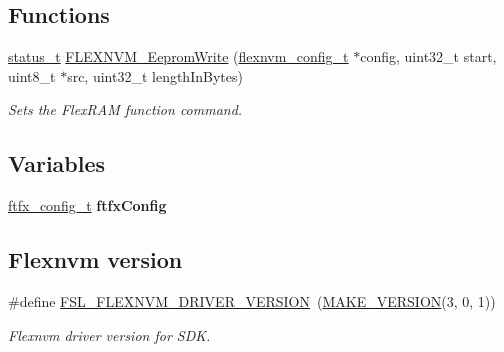 \subsection*{Functions}
\begin{DoxyCompactItemize}
\item 
\mbox{\hyperlink{group__ksdk__common_gaaabdaf7ee58ca7269bd4bf24efcde092}{status\+\_\+t}} \mbox{\hyperlink{group__ftfx__flexnvm__driver_ga38dc1922e79536abd0a3e9745d8da6e1}{F\+L\+E\+X\+N\+V\+M\+\_\+\+Eeprom\+Write}} (\mbox{\hyperlink{group__ftfx__flexnvm__driver_ga8fd4d473c0a4b30cac163160fb28a6c1}{flexnvm\+\_\+config\+\_\+t}} $\ast$config, uint32\+\_\+t start, uint8\+\_\+t $\ast$src, uint32\+\_\+t length\+In\+Bytes)
\begin{DoxyCompactList}\small\item\em Sets the Flex\+R\+AM function command. \end{DoxyCompactList}\end{DoxyCompactItemize}
\subsection*{Variables}
\begin{DoxyCompactItemize}
\item 
\mbox{\label{group__ftfx__flexnvm__driver_ga3e5d62da168e379cd9ffdf76d929bb38}} 
\mbox{\hyperlink{group__ftfx__controller_gab0196063c05bffb4cd2f249699a3378c}{ftfx\+\_\+config\+\_\+t}} {\bfseries ftfx\+Config}
\end{DoxyCompactItemize}
\subsection*{Flexnvm version}
\begin{DoxyCompactItemize}
\item 
\#define \mbox{\hyperlink{group__ftfx__flexnvm__driver_ga3edd4456238450f55464e5274aa7089b}{F\+S\+L\+\_\+\+F\+L\+E\+X\+N\+V\+M\+\_\+\+D\+R\+I\+V\+E\+R\+\_\+\+V\+E\+R\+S\+I\+ON}}~(\mbox{\hyperlink{group__ftfx__utilities_ga812138aa3315b0c6953c1a26130bcc37}{M\+A\+K\+E\+\_\+\+V\+E\+R\+S\+I\+ON}}(3, 0, 1))
\begin{DoxyCompactList}\small\item\em Flexnvm driver version for S\+DK. \end{DoxyCompactList}\end{DoxyCompactItemize}
